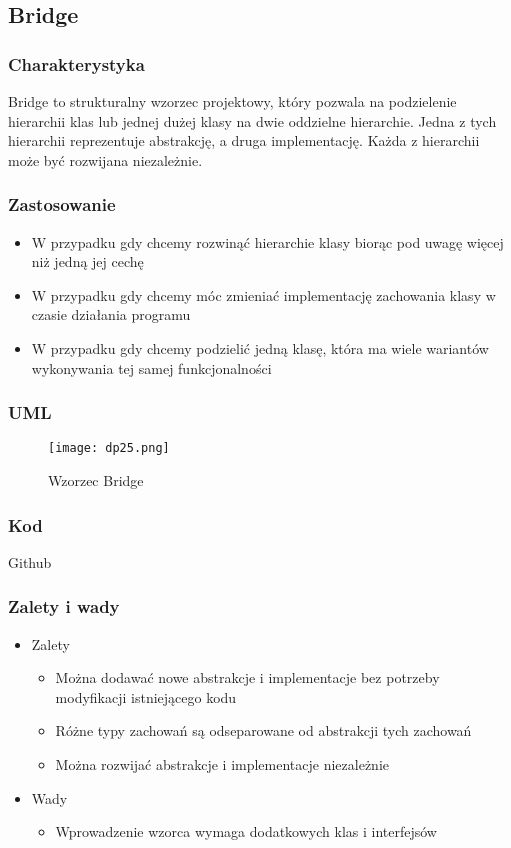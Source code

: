 \documentclass[a4paper,15pt]{article}
\begin{document}
\newpage
\subsection{Bridge}

\subsubsection{Charakterystyka}
Bridge to strukturalny wzorzec projektowy, który pozwala na podzielenie hierarchii klas lub jednej dużej klasy na dwie oddzielne hierarchie. Jedna z tych hierarchii reprezentuje abstrakcję, a druga implementację. Każda z hierarchii może być rozwijana niezależnie. 

\subsubsection{Zastosowanie}
\begin{itemize}
\item W przypadku gdy chcemy rozwinąć hierarchie klasy biorąc pod uwagę więcej niż jedną jej cechę
\item W przypadku gdy chcemy móc zmieniać implementację zachowania klasy w czasie działania programu
\item W przypadku gdy chcemy podzielić jedną klasę, która ma wiele wariantów wykonywania tej samej funkcjonalności
\end{itemize}

\subsubsection{UML}

\begin{figure}[H]
\centering
  \texttt{[image: dp25.png]}
  \caption{Wzorzec Bridge}
\end{figure}

\subsubsection{Kod}
Github

\subsubsection{Zalety i wady}


\begin{itemize}
\item Zalety
\begin{itemize}
\item Można dodawać nowe abstrakcje i implementacje bez potrzeby modyfikacji istniejącego kodu
\item Różne typy zachowań są odseparowane od abstrakcji tych zachowań
\item Można rozwijać abstrakcje i implementacje niezależnie
\end{itemize}
\item Wady
\begin{itemize}
\item Wprowadzenie wzorca wymaga dodatkowych klas i interfejsów
\end{itemize}
\end{itemize}
\end{document}
